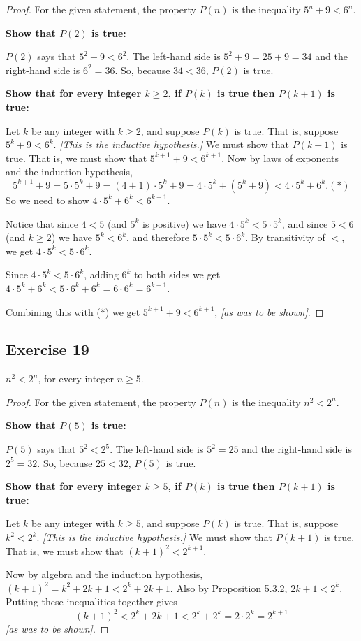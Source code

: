 \documentclass[14pt]{extarticle}
\begin{document}
\begin{proof}
For the given statement, the property $P(n)$ is the inequality $5^n + 9 < 6^n$. 

{\bf Show that $P(2)$ is true:} 

$P(2)$ says that $5^2 + 9 < 6^2$. The left-hand side is $5^2 + 9 = 25 + 9 = 34$ and the right-hand side is $6^2 = 36$. So, because $34 < 36$, $P(2)$ is true. 

{\bf Show that for every integer $k \geq 2$, if $P(k)$ is true then $P(k + 1)$ is true:} 

Let $k$ be any integer with $k \geq 2$, and suppose $P(k)$ is true. That is, suppose $5^k + 9 < 6^k$. {\it [This is the inductive hypothesis.]} We must show that $P(k + 1)$ is true. That is, we must show that $5^{k+1} + 9 < 6^{k+1}$. Now by laws of exponents and the induction hypothesis,
\[
5^{k+1} + 9 = 5 \cdot 5^k + 9 = (4 + 1) \cdot 5^k + 9 = 4 \cdot 5^k + (5^k + 9) < 4 \cdot 5^k + 6^k. (*)
\]
So we need to show $4 \cdot 5^k + 6^k < 6^{k+1}$.

Notice that since $4 < 5$ (and $5^k$ is positive) we have $4 \cdot 5^k < 5 \cdot 5^k$, and since $5 < 6$ (and $k \geq 2$) we have $5^k < 6^k$, and therefore $5 \cdot 5^k < 5 \cdot 6^k$. By transitivity of $<$, we get $4 \cdot 5^k < 5 \cdot 6^k$.

Since $4 \cdot 5^k < 5 \cdot 6^k$, adding $6^k$ to both sides we get $4 \cdot 5^k + 6^k < 5 \cdot 6^k + 6^k = 6 \cdot 6^k = 6^{k+1}$.

Combining this with (*) we get $5^{k+1} + 9 < 6^{k+1}$, {\it [as was to be shown]}.
\end{proof}

\subsection{Exercise 19}
$n^2 < 2^n$, for every integer $n \geq 5$.

\begin{proof}
For the given statement, the property $P(n)$ is the inequality $n^2 < 2^n$. 

{\bf Show that $P(5)$ is true:} 

$P(5)$ says that $5^2 < 2^5$. The left-hand side is $5^2 = 25$ and the right-hand side is $2^5 = 32$. So, because $25 < 32$, $P(5)$ is true. 

{\bf Show that for every integer $k \geq 5$, if $P(k)$ is true then $P(k + 1)$ is true:} 

Let $k$ be any integer with $k \geq 5$, and suppose $P(k)$ is true. That is, suppose $k^2 < 2^k$. {\it [This is the inductive hypothesis.]} We must show that $P(k + 1)$ is true. That is, we must show that $(k+1)^2 < 2^{k+1}$. 

Now by algebra and the induction hypothesis, $(k+1)^2 = k^2 + 2k + 1 < 2^k + 2k + 1$. Also by Proposition 5.3.2, $2k + 1 < 2^k$. Putting these inequalities together gives
\[
(k+1)^2 < 2^k + 2k + 1 < 2^k + 2^k = 2 \cdot 2^k = 2^{k+1}
\]
{\it [as was to be shown]}.
\end{proof}
\end{document}

